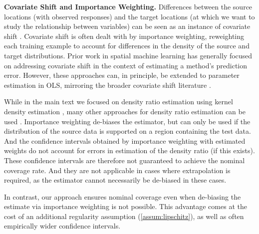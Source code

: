 \textbf{Covariate Shift and Importance Weighting.}
Differences between the source locations (with observed responses) and the target locations (at which we want to study the relationship between variables) can be seen as an instance of covariate shift \citep{pmlr-v235-rolf24a, tuia2016domain,weber_nnsvg_2023}. Covariate shift is often dealt with by importance weighting, reweighting each training example to account for differences in the density of the source and target distributions. Prior work in spatial machine learning has generally focused on addressing covariate shift 
in the context of estimating a method's prediction error. However, these approaches can, in principle, be extended to parameter estimation in OLS, mirroring 
the broader covariate shift literature \citep{shimodaira_improving_2000}.
 

While in the main text we focused on density ratio estimation using kernel density estimation \citep{shimodaira_improving_2000}, many other approaches for density ratio estimation can be used \citep{Sugiyama_Suzuki_Kanamori_2012,kanamori2012statistical,gretton2008covariate,que2013inverse,Sugiyama2008kliep}. Importance weighting de-biases the estimator, but can only be used if the distribution of the source data is supported on a region containing the test data. And the confidence intervals obtained by importance weighting with estimated weights do not account for errors in estimation of the density ratio (if this exists). These confidence intervals are therefore not guaranteed to achieve the nominal coverage rate. And they are not applicable in cases where extrapolation is required, as the estimator cannot necessarily be de-biased in these cases. 

In contrast, our approach ensures nominal coverage even when de-biasing the estimate 
via importance weighting is not possible. This advantage comes at the cost 
of an additional regularity assumption (\cref{assum:lipschitz}), as well as often empirically wider confidence intervals.

